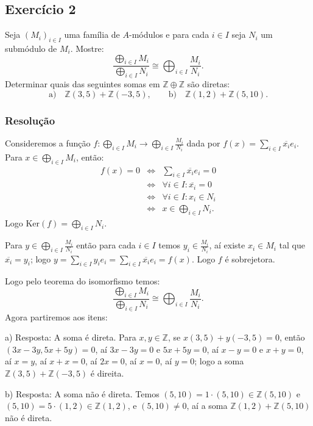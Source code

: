 \documentclass[10pt,a4paper]{article}
\begin{document}
\subsection*{Exercício 2}

Seja $(M_i)_{i\in I}$ uma família de $A$-módulos e para cada $i\in I$ seja $N_i$ um submódulo de $M_i$. Mostre:
\[
\frac{\bigoplus_{i\in I}M_i}{\bigoplus_{i\in I}N_i}\cong\bigoplus_{i\in I}\frac{M_i}{N_i}.
\]
Determinar quais das seguintes somas em $\mathbb{Z}\oplus\mathbb{Z}$ são diretas:
\[
\text{a)}\quad\mathbb{Z}(3,5)+\mathbb{Z}(-3,5),\quad\quad\text{b)}\quad\mathbb{Z}(1,2)+\mathbb{Z}(5,10).
\]

\subsubsection*{Resolução}

Consideremos a função $f:\bigoplus_{i\in I}M_i\rightarrow\bigoplus_{i\in I}\frac{M_i}{N_i}$ dada por $f(x)=\sum_{i\in I}\overline{x_i}e_i$. Para $x\in\bigoplus_{i\in I}M_i$, então:
\[
\begin{array}{rcl}
f(x)=0&\Leftrightarrow&\sum_{i\in I}\overline{x_i}e_i=0\\&\Leftrightarrow&\forall i\in I:\overline{x_i}=0\\&\Leftrightarrow&\forall i\in I:x_i\in N_i\\&\Leftrightarrow&x\in\bigoplus_{i\in I}N_i.
\end{array}
\]
Logo $\mathrm{Ker}(f)=\bigoplus_{i\in I}N_i$.

\medskip
\noindent
Para $y\in\bigoplus_{i\in I}\frac{M_i}{N_i}$ então para cada $i\in I$ temos $y_i\in\frac{M_i}{N_i}$, aí existe $x_i\in M_i$ tal que $\overline{x_i}=y_i$; logo $y=\sum_{i\in I}y_ie_i=\sum_{i\in I}\overline{x_i}e_i=f(x)$. Logo $f$ é sobrejetora.

\medskip
\noindent
Logo pelo teorema do isomorfismo temos:
\[
\frac{\bigoplus_{i\in I}M_i}{\bigoplus_{i\in I}N_i}\cong\bigoplus_{i\in I}\frac{M_i}{N_i}.
\]
Agora partiremos aos itens:

\medskip
\noindent
a) Resposta: A soma é direta. Para $x,y\in\mathbb{Z}$, se $x(3,5)+y(-3,5)=0$, então $(3x-3y,5x+5y)=0$, aí $3x-3y=0$ e $5x+5y=0$, aí $x-y=0$ e $x+y=0$, aí $x=y$, aí $x+x=0$, aí $2x=0$, aí $x=0$, aí $y=0$; logo a soma $\mathbb{Z}(3,5)+\mathbb{Z}(-3,5)$ é direita.

\medskip
\noindent
b) Resposta: A soma não é direta. Temos $(5,10)=1\cdot(5,10)\in\mathbb{Z}(5,10)$ e $(5,10)=5\cdot(1,2)\in\mathbb{Z}(1,2)$, e $(5,10)\neq 0$, aí a soma $\mathbb{Z}(1,2)+\mathbb{Z}(5,10)$ não é direta.
\end{document}
